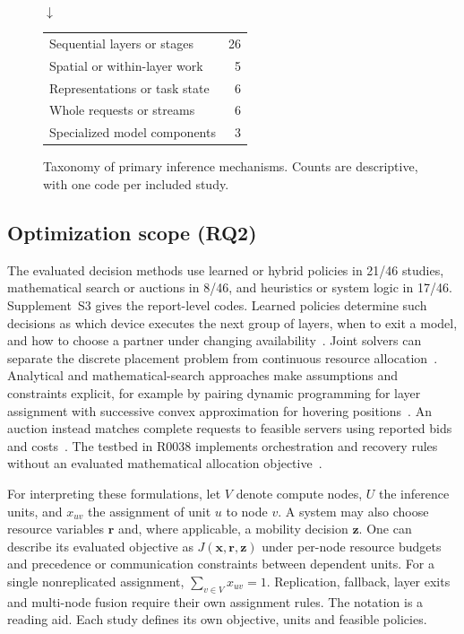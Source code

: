 \documentclass[pdflatex,sn-vancouver-num]{sn-jnl}
\begin{document}
\begin{figure}[tb]
\centering\small
{}\\[2pt]
$\downarrow$\\[2pt]
\begin{tabular}{@{}p{.58\linewidth}r@{}}
\toprule
Sequential layers or stages & 26\\
Spatial or within-layer work & 5\\
Representations or task state & 6\\
Whole requests or streams & 6\\
Specialized model components & 3\\
\bottomrule
\end{tabular}
\caption{Taxonomy of primary inference mechanisms. Counts are descriptive, with one code per included study.}
\label{fig:taxonomy}
\end{figure}

\subsection{Optimization scope (RQ2)}\label{sec:rq2}
The evaluated decision methods use learned or hybrid policies in 21/46 studies, mathematical search or auctions in 8/46, and heuristics or system logic in 17/46. Supplement~S3 gives the report-level codes. Learned policies determine such decisions as which device executes the next group of layers, when to exit a model, and how to choose a partner under changing availability~\cite{R0010,R0075,R0092}. Joint solvers can separate the discrete placement problem from continuous resource allocation~\cite{R0001,R0045}. Analytical and mathematical-search approaches make assumptions and constraints explicit, for example by pairing dynamic programming for layer assignment with successive convex approximation for hovering positions~\cite{R0006}. An auction instead matches complete requests to feasible servers using reported bids and costs~\cite{R0058}. The testbed in R0038 implements orchestration and recovery rules without an evaluated mathematical allocation objective~\cite{R0038}.

For interpreting these formulations, let $V$ denote compute nodes, $U$ the inference units, and $x_{uv}$ the assignment of unit $u$ to node $v$. A system may also choose resource variables $\mathbf{r}$ and, where applicable, a mobility decision $\mathbf{z}$. One can describe its evaluated objective as $J(\mathbf{x},\mathbf{r},\mathbf{z})$ under per-node resource budgets and precedence or communication constraints between dependent units. For a single nonreplicated assignment, $\sum_{v \in V} x_{uv}=1$. Replication, fallback, layer exits and multi-node fusion require their own assignment rules. The notation is a reading aid. Each study defines its own objective, units and feasible policies.
\end{document}
